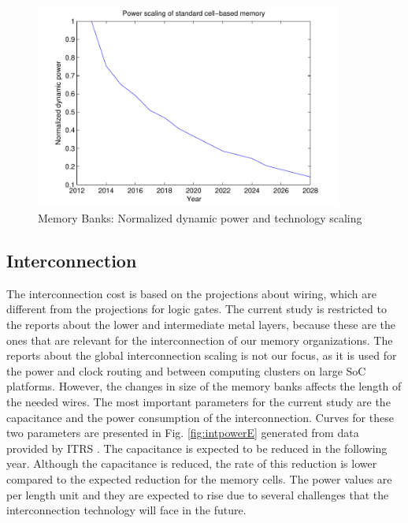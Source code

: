   \begin{figure}
 \centering
 \includegraphics[width = 0.9\textwidth]{E/cellpower.pdf}
  \caption{Memory Banks: Normalized dynamic power and technology scaling}
 \label{fig:powerE}
 \end{figure}

\subsection{Interconnection}

The interconnection cost is based on the projections about wiring, which are different from the projections for logic gates.
The current study is restricted to the reports about the lower and intermediate metal layers, because these are the ones that are relevant for the interconnection of our memory organizations.
The reports about the global interconnection scaling is not our focus, as it is used for the power and clock routing and between computing clusters on large SoC platforms.
However, the changes in size of the memory banks affects the length of the needed wires.
The most important parameters for the current study are the capacitance and the power consumption of the interconnection.
Curves for these two parameters are presented in Fig. \ref{fig:intpowerE} generated from data provided by ITRS \cite{itrs2}.
The capacitance is expected to be reduced in the following year.
Although the capacitance is reduced, the rate of this reduction is lower compared to the expected reduction for the memory cells.
The power values are per length unit and they are expected to rise due to several challenges that the interconnection technology will face in the future.

